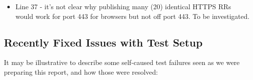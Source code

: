 \begin{itemize}
    \item Line 37 - it's not clear why publishing many (20) identical HTTPS RRs
        would work for port 443 for browsers but not off port 443. To be
        investigated.

\end{itemize}


\subsection{Recently Fixed Issues with Test Setup}

It may be illustrative to describe some self-caused test failures seen as we
were preparing this report, and how those were resolved:

